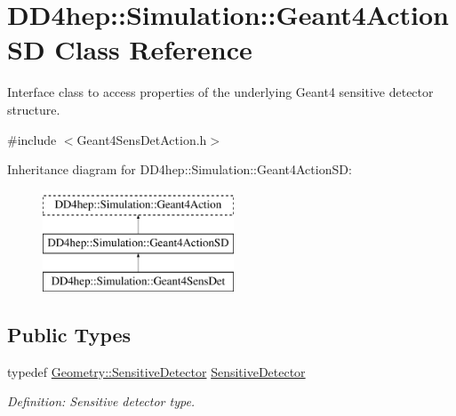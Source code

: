 \hypertarget{class_d_d4hep_1_1_simulation_1_1_geant4_action_s_d}{}\section{D\+D4hep\+:\+:Simulation\+:\+:Geant4\+Action\+SD Class Reference}
\label{class_d_d4hep_1_1_simulation_1_1_geant4_action_s_d}


Interface class to access properties of the underlying Geant4 sensitive detector structure.  




{\ttfamily \#include $<$Geant4\+Sens\+Det\+Action.\+h$>$}

Inheritance diagram for D\+D4hep\+:\+:Simulation\+:\+:Geant4\+Action\+SD\+:\begin{figure}[H]
\begin{center}
\leavevmode
\includegraphics[height=3.000000cm]{class_d_d4hep_1_1_simulation_1_1_geant4_action_s_d}
\end{center}
\end{figure}
\subsection*{Public Types}
\begin{DoxyCompactItemize}
\item 
typedef \hyperlink{class_d_d4hep_1_1_geometry_1_1_sensitive_detector}{Geometry\+::\+Sensitive\+Detector} \hyperlink{class_d_d4hep_1_1_simulation_1_1_geant4_action_s_d_a8a292947ea3f9b419728ef729a7e3fae}{Sensitive\+Detector}
\begin{DoxyCompactList}\small\item\em Definition\+: Sensitive detector type. \end{DoxyCompactList}\end{DoxyCompactItemize}
